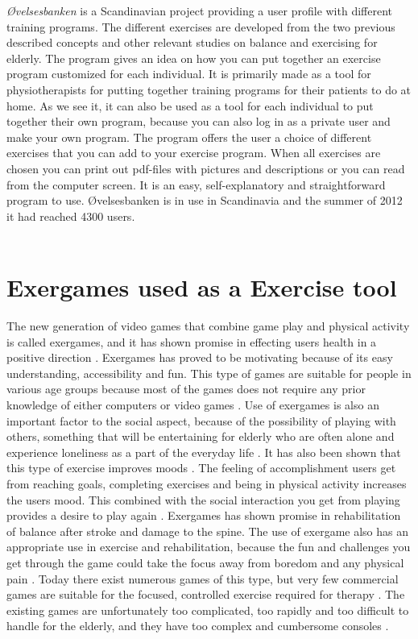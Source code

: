 \emph{{Ø}velsesbanken} is a Scandinavian project providing a user profile with different training programs. The different exercises are developed from the two previous described concepts and other relevant studies on balance and exercising for elderly. The program gives an idea on how you can put together an exercise program customized for each individual. It is primarily made as a tool for physiotherapists for putting together training programs for their patients to do at home. As we see it, it can also be used as a tool for each individual to put together their own program, because you can also log in as a private user and make your own program. The program offers the user a choice of different exercises that you can add to your exercise program. When all exercises are chosen you can print out pdf-files with pictures and descriptions or you can read from the computer screen. It is an easy, self-explanatory and straightforward program to use. {Ø}velsesbanken is in use in Scandinavia and the summer of 2012 it had reached 4300 users. \cite{ovelsesbank}\\ \\

\section{Exergames used as a Exercise tool}
The new generation of video games that combine game play and physical activity is called exergames, and it has shown promise in effecting users health in a positive direction \cite{promotingexercise}. Exergames has proved to be motivating because of its easy understanding, accessibility and fun. This type of games are suitable for people in various age groups because most of the games does not require any prior knowledge of either computers or video games \cite{garcia2012exergames}. Use of exergames is also an important factor to the social aspect, because of the possibility of playing with others, something that will be entertaining for elderly who are often alone and experience loneliness as a part of the everyday life \cite{exergamesforelderly}. It has also been shown that this type of exercise improves moods \cite{staiano2011exergames}. The feeling of accomplishment users get from reaching goals, completing exercises and being in physical activity increases the users mood. This combined with the social interaction you get from playing provides a desire to play again \cite{exergamesforelderly} \cite{staiano2011exergames}. Exergames has shown promise in rehabilitation of balance after stroke and damage to the spine. The use of exergame also has an appropriate use in exercise and rehabilitation, because the fun and challenges you get through the game could take the focus away from boredom and any physical pain \cite{exergamesforelderly} \cite{lange2011development}. Today there exist numerous games of this type, but very few commercial games are suitable for the focused, controlled exercise required for therapy \cite{lange2011development}. The existing games are unfortunately too complicated, too rapidly and too difficult to handle for the elderly, and they have too complex and cumbersome consoles \cite{exergamesforelderly}. 

